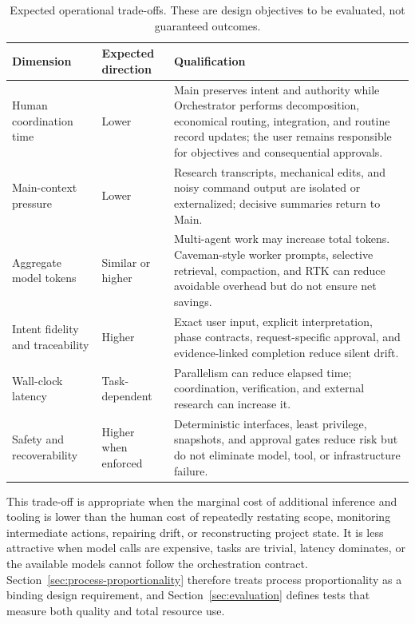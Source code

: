 \documentclass[11pt,a4paper]{article}
\begin{document}
\begin{table}[H]
\centering
\caption{Expected operational trade-offs. These are design objectives to be evaluated, not guaranteed outcomes.}
\begin{tabularx}{\textwidth}{P{0.23\textwidth}P{0.22\textwidth}Y}
\toprule
\textbf{Dimension} & \textbf{Expected direction} & \textbf{Qualification} \\
\midrule
Human coordination time & Lower & Main preserves intent and authority while Orchestrator performs decomposition, economical routing, integration, and routine record updates; the user remains responsible for objectives and consequential approvals. \\
Main-context pressure & Lower & Research transcripts, mechanical edits, and noisy command output are isolated or externalized; decisive summaries return to Main. \\
Aggregate model tokens & Similar or higher & Multi-agent work may increase total tokens. Caveman-style worker prompts, selective retrieval, compaction, and RTK can reduce avoidable overhead but do not ensure net savings. \\
Intent fidelity and traceability & Higher & Exact user input, explicit interpretation, phase contracts, request-specific approval, and evidence-linked completion reduce silent drift. \\
Wall-clock latency & Task-dependent & Parallelism can reduce elapsed time; coordination, verification, and external research can increase it. \\
Safety and recoverability & Higher when enforced & Deterministic interfaces, least privilege, snapshots, and approval gates reduce risk but do not eliminate model, tool, or infrastructure failure. \\
\bottomrule
\end{tabularx}
\end{table}

This trade-off is appropriate when the marginal cost of additional inference and tooling is lower than the human cost of repeatedly restating scope, monitoring intermediate actions, repairing drift, or reconstructing project state. It is less attractive when model calls are expensive, tasks are trivial, latency dominates, or the available models cannot follow the orchestration contract. Section~\ref{sec:process-proportionality} therefore treats process proportionality as a binding design requirement, and Section~\ref{sec:evaluation} defines tests that measure both quality and total resource use.
\end{document}
